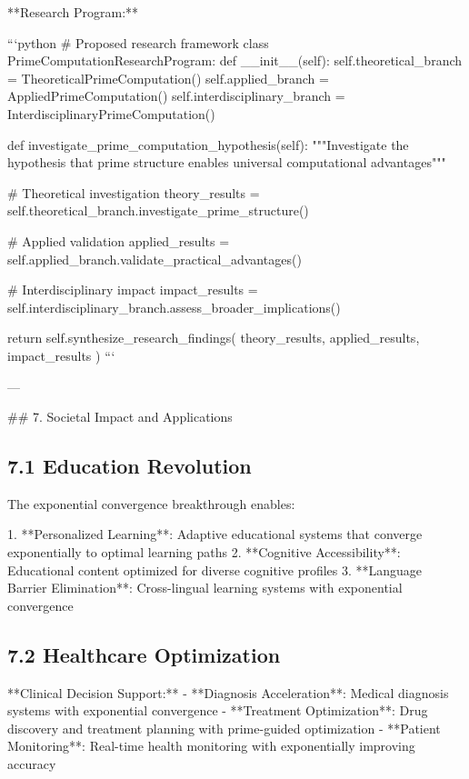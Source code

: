\documentclass[12pt,a4paper]{article}
\begin{document}
**Research Program:**

```python
# Proposed research framework
class PrimeComputationResearchProgram:
    def __init__(self):
        self.theoretical_branch = TheoreticalPrimeComputation()
        self.applied_branch = AppliedPrimeComputation()
        self.interdisciplinary_branch = InterdisciplinaryPrimeComputation()
        
    def investigate_prime_computation_hypothesis(self):
        """Investigate the hypothesis that prime structure enables universal computational advantages"""
        
        # Theoretical investigation
        theory_results = self.theoretical_branch.investigate_prime_structure()
        
        # Applied validation
        applied_results = self.applied_branch.validate_practical_advantages()
        
        # Interdisciplinary impact
        impact_results = self.interdisciplinary_branch.assess_broader_implications()
        
        return self.synthesize_research_findings(
            theory_results, applied_results, impact_results
        )
```

---

## 7. Societal Impact and Applications

\subsection{7.1 Education Revolution}

The exponential convergence breakthrough enables:

1. **Personalized Learning**: Adaptive educational systems that converge exponentially to optimal learning paths
2. **Cognitive Accessibility**: Educational content optimized for diverse cognitive profiles
3. **Language Barrier Elimination**: Cross-lingual learning systems with exponential convergence

\subsection{7.2 Healthcare Optimization}

**Clinical Decision Support:**
- **Diagnosis Acceleration**: Medical diagnosis systems with exponential convergence
- **Treatment Optimization**: Drug discovery and treatment planning with prime-guided optimization
- **Patient Monitoring**: Real-time health monitoring with exponentially improving accuracy
\end{document}

